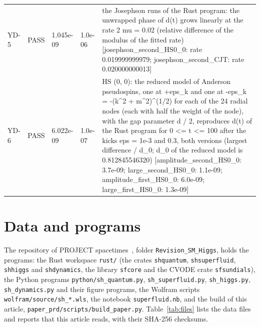 \documentclass[aps,prd,onecolumn,superscriptaddress,nofootinbib,floatfix,longbibliography]{revtex4-2}
\begin{document}
\begin{longtable}{p{}p{}p{}p{}p{}}
YD-5 & PASS & 1.045e-09 & 1.0e-06 & the Josephson runs of the Rust program: the unwrapped phase of d(t) grows linearly at the rate 2 mu = 0.02 (relative difference of the modulus of the fitted rate) [josephson\_second\_HS0\_0: rate 0.019999999979; josephson\_second\_CJT: rate 0.020000000013] \\
YD-6 & PASS & 6.022e-09 & 1.0e-07 & HS (0, 0): the reduced model of Anderson pseudospins, one at +eps\_k and one at -eps\_k = -(k\textasciicircum{}2 + m\textasciicircum{}2)\textasciicircum{}(1/2) for each of the 24 radial nodes (each with half the weight of the node), with the gap parameter d / 2, reproduces d(t) of the Rust program for 0 \textless{}= t \textless{}= 100 after the kicks eps = 1e-3 and 0.3, both versions (largest \textbar{}difference\textbar{} / d\_0; d\_0 of the reduced model is 0.812845546320) [amplitude\_second\_HS0\_0: 3.7e-09; large\_second\_HS0\_0: 1.1e-09; amplitude\_first\_HS0\_0: 6.0e-09; large\_first\_HS0\_0: 1.3e-09] \\
\end{longtable}
\endgroup

\section{Data and programs}
\label{sec:data}

The repository of PROJECT spacetimes~\cite{Repo}, folder \texttt{Revision\_SM\_Higgs}, holds the programs: the Rust
workspace \texttt{rust/} (the crates \texttt{shquantum}, \texttt{shsuperfluid}, \texttt{shhiggs} and \texttt{shdynamics}, the
library \texttt{sfcore} and the CVODE crate \texttt{sfsundials}), the Python programs \texttt{python/sh\_quantum.py},
\texttt{sh\_superfluid.py}, \texttt{sh\_higgs.py}, \texttt{sh\_dynamics.py} and their figure programs, the Wolfram scripts
\texttt{wolfram/source/sh\_*.wls}, the notebook \texttt{superfluid.nb}, and the build of this article,
\texttt{paper\_prd/scripts/build\_paper.py}. Table~\ref{tab:files} lists the data files and reports that this article reads,
with their SHA-256 checksums.
\end{document}
